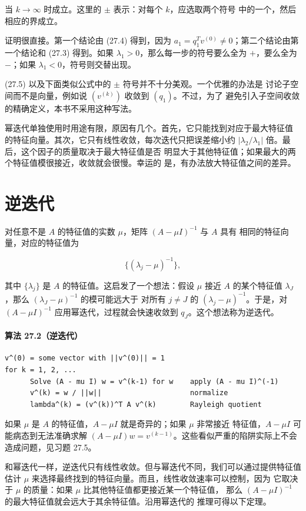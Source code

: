 \documentclass[UTF8,fontset=none,12pt]{ctexart}
\begin{document}
当 $k\to\infty$ 时成立。这里的 $\pm$ 表示：对每个 $k$，应选取两个符号
中的一个，然后相应的界成立。

证明很直接。第一个结论由 (27.4) 得到，因为
$a_1=q_1^Tv^{(0)}\ne0$；第二个结论由第一个结论和 (27.3) 得到。如果
$\lambda_1>0$，那么每一步的符号要么全为 $+$，要么全为 $-$；如果
$\lambda_1<0$，符号则交替出现。

(27.5) 以及下面类似公式中的 $\pm$ 符号并不十分美观。一个优雅的办法是
讨论子空间而不是向量，例如说 $(v^{(k)})$ 收敛到 $(q_1)$。不过，为了
避免引入子空间收敛的精确定义，本书不采用这种写法。

幂迭代单独使用时用途有限，原因有几个。首先，它只能找到对应于最大特征值
的特征向量。其次，它只有线性收敛，每次迭代只把误差缩小约
$|\lambda_2/\lambda_1|$ 倍。最后，这个因子的质量取决于最大特征值是否
明显大于其他特征值；如果最大的两个特征值模很接近，收敛就会很慢。幸运的
是，有办法放大特征值之间的差异。

\section*{逆迭代}

对任意不是 $A$ 的特征值的实数 $\mu$，矩阵 $(A-\mu I)^{-1}$ 与 $A$ 具有
相同的特征向量，对应的特征值为

\[
\{(\lambda_j-\mu)^{-1}\},
\]

其中 $\{\lambda_j\}$ 是 $A$ 的特征值。这启发了一个想法：假设 $\mu$ 接近
$A$ 的某个特征值 $\lambda_J$，那么 $(\lambda_J-\mu)^{-1}$ 的模可能远大于
对所有 $j\ne J$ 的 $(\lambda_j-\mu)^{-1}$。于是，对
$(A-\mu I)^{-1}$ 应用幂迭代，过程就会快速收敛到 $q_J$。这个想法称为逆迭代。

\paragraph{算法 27.2（逆迭代）}
\begin{verbatim}
v^(0) = some vector with ||v^(0)|| = 1
for k = 1, 2, ...
      Solve (A - mu I) w = v^(k-1) for w    apply (A - mu I)^(-1)
      v^(k) = w / ||w||                     normalize
      lambda^(k) = (v^(k))^T A v^(k)        Rayleigh quotient
\end{verbatim}

如果 $\mu$ 是 $A$ 的特征值，$A-\mu I$ 就是奇异的；如果 $\mu$ 非常接近
特征值，$A-\mu I$ 可能病态到无法准确求解
$(A-\mu I)w=v^{(k-1)}$。这些看似严重的陷阱实际上不会造成问题，见习题
27.5。

和幂迭代一样，逆迭代只有线性收敛。但与幂迭代不同，我们可以通过提供特征值
估计 $\mu$ 来选择最终找到的特征向量。而且，线性收敛速率可以控制，因为
它取决于 $\mu$ 的质量：如果 $\mu$ 比其他特征值都更接近某一个特征值，
那么 $(A-\mu I)^{-1}$ 的最大特征值就会远大于其余特征值。沿用幂迭代的
推理可得以下定理。
\end{document}
